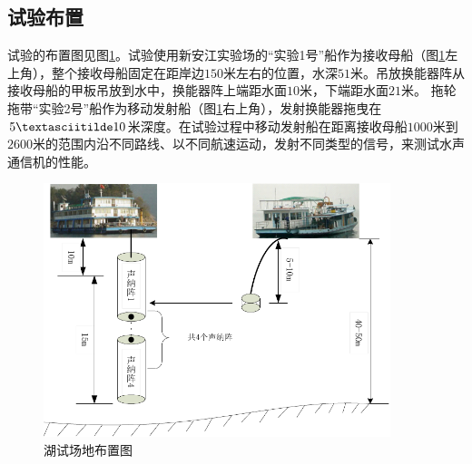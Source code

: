 \subsection{试验布置}
试验的布置图见图\ref{fig:6.3}。试验使用新安江实验场的“实验1号”船作为接收母船（图\ref{fig:6.3}左上角），整个接收母船固定在距岸边$150$米左右的位置，水深$51$米。吊放换能器阵从接收母船的甲板吊放到水中，换能器阵上端距水面$10$米，下端距水面$21$米。
拖轮拖带“实验2号”船作为移动发射船（图\ref{fig:6.3}右上角），发射换能器拖曳在$5\textasciitilde10$米深度。在试验过程中移动发射船在距离接收母船$1000$米到$2600$米的范围内沿不同路线、以不同航速运动，发射不同类型的信号，来测试水声通信机的性能。
\begin{figure}[htb]
  \begin{center}
    \includegraphics[width=0.9\textwidth]{images/trans.pdf}
  \end{center}
  \caption{湖试场地布置图}
  \label{fig:6.3}
\end{figure}
